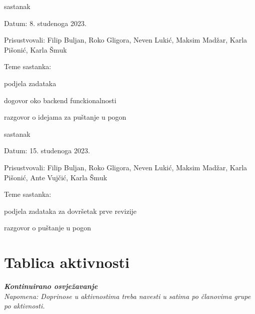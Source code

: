 \begin{packed_enum}
			\item  sastanak
			\item[] \begin{packed_item}
				\item Datum: 8. studenoga 2023.
				\item Prisustvovali: Filip Buljan, Roko Gligora, Neven Lukić, Maksim Madžar, Karla Pišonić, Karla Šmuk
				\item Teme sastanka:
				\begin{packed_item}
					\item  podjela zadataka
					\item  dogovor oko backend funckionalnosti
					\item  razgovor o idejama za puštanje u pogon
				\end{packed_item}
			\end{packed_item}
		
			\item  sastanak
			\item[] \begin{packed_item}
				\item Datum: 15. studenoga 2023.
				\item Prisustvovali: Filip Buljan, Roko Gligora, Neven Lukić, Maksim Madžar, Karla Pišonić, Ante Vujčić, Karla Šmuk
				\item Teme sastanka:
				\begin{packed_item}
					\item  podjela zadataka za dovršetak prve revizije
					\item  razgovor o puštanje u pogon
				\end{packed_item}
			\end{packed_item}
			
			
		\end{packed_enum}
		
		\eject
		\section*{Tablica aktivnosti}
		
			\textbf{\textit{Kontinuirano osvježavanje}}\\
			
			 \textit{Napomena: Doprinose u aktivnostima treba navesti u satima po članovima grupe po aktivnosti.}

